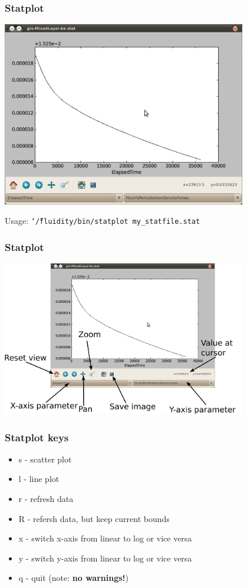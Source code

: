 \documentclass[12pt]{beamer}
\newcommand\TILDE{\char`\~}
\begin{document}
\begin{frame}
    \frametitle{Statplot}
\begin{center}
\includegraphics[width=0.8\textwidth]{images/statplot.png}
\end{center}
Usage: \texttt{\TILDE/fluidity/bin/statplot my\_statfile.stat}
\end{frame}

\begin{frame}
    \frametitle{Statplot}
\begin{center}
\includegraphics[width=0.8\textwidth]{images/statplot_labelled.png}
\end{center}
\end{frame}

\begin{frame}
    \frametitle{Statplot keys}
\begin{itemize}
\item s - scatter plot
\item l - line plot
\item r - refresh data
\item R - refersh data, but keep current bounds
\item x - switch x-axis from linear to log or vice versa
\item y - switch y-axis from linear to log or vice versa
\item q - quit (note: \textbf{no warnings!})
\end{itemize}
\end{frame}
\end{document}
